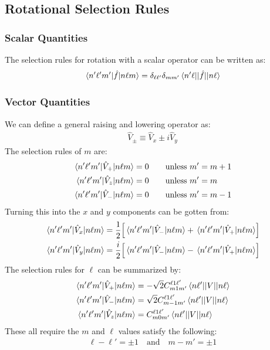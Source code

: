 \subsection{Rotational Selection Rules}
\subsubsection{Scalar Quantities}
The selection rules for rotation with a scalar operator can be written as:
\begin{align*}
  \mel{n'\ell'm'}{\hat{f}}{n\ell m}=
  \delta_{\ell\ell'}\delta_{mm'}\mel{n'\ell|}{\hat{f}}{|n\ell}
\end{align*}
\subsubsection{Vector Quantities}
We can define a general raising and lowering operator as:
\begin{align*}
  \hat{V}_\pm\equiv\hat{V}_x\pm i\hat{V}_y
\end{align*}
The selection rules of $m$ are:
\begin{align*}
  \mel{n'\ell'm'}{\hat{V}_+}{n\ell m}=0\quad&\quad\text{unless $m'=m+1$}\\
  \mel{n'\ell'm'}{\hat{V}_z}{n\ell m}=0\quad&\quad\text{unless $m'=m$}\\
  \mel{n'\ell'm'}{\hat{V}_-}{n\ell m}=0\quad&\quad\text{unless $m'=m-1$}
\end{align*}
Turning this into the $x$ and $y$ components can be gotten from:
\begin{align*}
  \mel{n'\ell'm'}{\hat{V}_x}{n\ell m}&=\dfrac{1}{2}
  \qty[\mel{n'\ell'm'}{\hat{V}_-}{n\ell m}+\mel{n'\ell'm'}{\hat{V}_+}{n\ell m}]\\
  \mel{n'\ell'm'}{\hat{V}_y}{n\ell m}&=\dfrac{i}{2}
  \qty[\mel{n'\ell'm'}{\hat{V}_-}{n\ell m}-\mel{n'\ell'm'}{\hat{V}_+}{n\ell m}]
\end{align*}
The selection rules for $\ell$ can be summarized by:
\begin{align*}
  \mel{n'\ell'm'}{\hat{V}_+}{n\ell m}&=
  -\sqrt{2}C_{m1m'}^{\ell1\ell'}\mel{n\ell'|}{V}{|n\ell}\\
  \mel{n'\ell'm'}{\hat{V}_-}{n\ell m}&=
  \sqrt{2}C_{m-1m'}^{\ell1\ell'}\mel{n\ell'|}{V}{|n\ell}\\
  \mel{n'\ell'm'}{\hat{V}_z}{n\ell m}&=C_{m0m'}^{\ell1\ell'}\mel{n\ell'|}{V}{|n\ell}
\end{align*}
These all require the $m$ and $\ell$ values satisfy the following:
\begin{align*}
  \ell-\ell'=\pm1\quad\text{and}\quad m-m'=\pm1
\end{align*}
